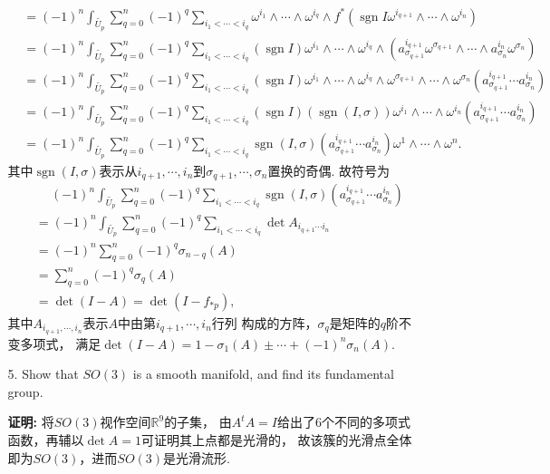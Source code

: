 \begin{itemize}
\begin{enumerate}
\begin{align*}
                    &=(-1)^n \int_{\tilde{U_p}} \sum_{q=0}^n (-1)^q \sum_{i_1<\cdots<i_q} \omega^{i_1}\wedge\cdots\wedge \omega^{i_q}\wedge f^*(\operatorname{sgn}I \omega^{i_{q+1}}\wedge \cdots \wedge \omega^{i_n})\\
                    &=(-1)^n \int_{\tilde{U_p}} \sum_{q=0}^n (-1)^q \sum_{i_1<\cdots<i_q} (\operatorname{sgn}I) \omega^{i_1}\wedge\cdots\wedge \omega^{i_q}\wedge (a^{i_{q+1}}_{\sigma_{q+1}}\omega^{\sigma_{q+1}}\wedge \cdots \wedge a^{i_n}_{\sigma_n}\omega^{\sigma_n})\\
                    &=(-1)^n \int_{\tilde{U_p}} \sum_{q=0}^n (-1)^q \sum_{i_1<\cdots<i_q} (\operatorname{sgn}I) \omega^{i_1}\wedge \cdots \wedge \omega^{i_q}\wedge \omega^{\sigma_{q+1}}\wedge \cdots \wedge \omega^{\sigma_n} (a^{i_{q+1}}_{\sigma_{q+1}}\cdots a^{i_n}_{\sigma_n})\\
                    &=(-1)^n \int_{\tilde{U_p}} \sum_{q=0}^n (-1)^q \sum_{i_1<\cdots<i_q} (\operatorname{sgn}I) (\operatorname{sgn}(I,\sigma)) \omega^{i_1}\wedge \cdots \wedge \omega^{i_n} (a^{i_{q+1}}_{\sigma_{q+1}}\cdots a^{i_n}_{\sigma_n})\\
                    &=(-1)^n \int_{\tilde{U_p}} \sum_{q=0}^n (-1)^q \sum_{i_1<\cdots<i_q} \operatorname{sgn}(I,\sigma) (a^{i_{q+1}}_{\sigma_{q+1}}\cdots a^{i_n}_{\sigma_n}) \omega^1\wedge \cdots \wedge \omega^n.
                \end{align*}
            其中$\operatorname{sgn}(I,\sigma)$表示从$i_{q+1},\cdots,i_n$到$\sigma_{q+1},\cdots,\sigma_n$置换的奇偶. 故符号为
                \begin{align*}
                    &\quad\ (-1)^n \int_{\tilde{U_p}} \sum_{q=0}^n (-1)^q 
                    \sum_{i_1<\cdots<i_q} \operatorname{sgn}(I,\sigma) 
                    (a^{i_{q+1}}_{\sigma_{q+1}}\cdots a^{i_n}_{\sigma_n})\\
                    &=(-1)^n \int_{\tilde{U_p}} \sum_{q=0}^n (-1)^q 
                    \sum_{i_1<\cdots<i_q} \det A_{i_{q+1}\cdots i_n}\\
                    &= (-1)^n \sum_{q=0}^n (-1)^q \sigma_{n-q}(A)\\
                    &=\sum_{q=0}^n (-1)^q \sigma_{q}(A)\\
                    &=\det(I-A)=\det (I-f_{*p}),
                \end{align*}
            其中$A_{i_{q+1},\cdots,i_n}$表示$A$中由第$i_{q+1},\cdots,i_n$行列
            构成的方阵，$\sigma_q$是矩阵的$q$阶不变多项式，
            满足$\det(I-A)=1-\sigma_1(A)\pm\cdots +(-1)^n \sigma_n(A)$.
            \item[5.] Show that $SO(3)$ is a smooth manifold, and find its fundamental group.
            \item[\textbf{证明:}] \qquad 将$SO(3)$视作空间$\mathbb{R}^9$的子集，
            由$A^t A=I$给出了$6$个不同的多项式函数，再辅以$\det A=1$可证明其上点都是光滑的，
            故该簇的光滑点全体即为$SO(3)$，进而$SO(3)$是光滑流形.


\end{enumerate}
\end{itemize}
